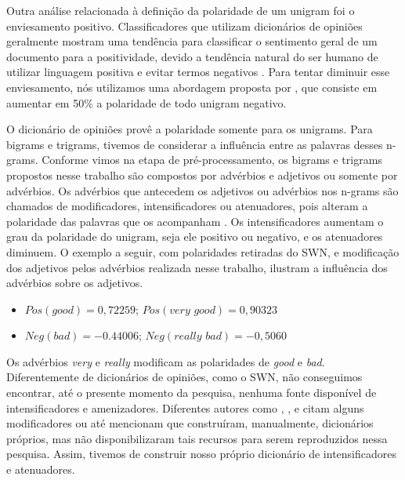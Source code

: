 \documentclass[template.tex]{subfiles}
\begin{document}
Outra análise relacionada à definição da polaridade de um unigram foi o enviesamento positivo. Classificadores que utilizam dicionários de opiniões geralmente mostram uma tendência para classificar o sentimento geral de um documento para a positividade, devido a tendência natural do ser humano de utilizar linguagem positiva e evitar termos negativos \cite{boucher1969pollyanna, kennedy2006sentiment}. Para tentar diminuir esse enviesamento, nós utilizamos uma abordagem proposta por , que consiste em aumentar em 50\% a polaridade de todo unigram negativo. 


O dicionário de opiniões provê a polaridade somente para os unigrams. Para bigrams e trigrams, tivemos de considerar a influência entre as palavras desses n-grams. Conforme vimos na etapa de pré-processamento, os bigrams e trigrams propostos nesse trabalho são compostos por advérbios e adjetivos ou somente por advérbios. Os advérbios que antecedem os adjetivos ou advérbios nos n-grams são chamados de modificadores, intensificadores ou atenuadores, pois alteram a polaridade das palavras que os acompanham \cite{voll2007not}. Os intensificadores aumentam o grau da polaridade do unigram, seja ele positivo ou negativo, e os atenuadores diminuem. O exemplo a seguir, com polaridades retiradas do SWN, e modificação dos adjetivos pelos advérbios realizada nesse trabalho, ilustram a influência dos advérbios sobre os adjetivos.  


\begin{itemize}
\item \label{itm:very_exem} $Pos(\textit{good}) = 0,72259$; $Pos(\textit{very good}) = 0,90323$
\item \label{itm:really_exem} $Neg(\textit{bad}) = -0.44006$; $Neg(\textit{really bad}) = -0,5060$
\end{itemize}

Os advérbios \textit{very} e \textit{really} modificam as polaridades de \textit{good} e \textit{bad}. Diferentemente de dicionários de opiniões, como o SWN, não conseguimos encontrar, até o presente momento da pesquisa, nenhuma fonte disponível de intensificadores e amenizadores. Diferentes autores como , ,  e  citam alguns modificadores ou até mencionam que construíram, manualmente, dicionários próprios, mas não disponibilizaram tais recursos para serem reproduzidos nessa pesquisa. Assim, tivemos de construir nosso próprio dicionário de intensificadores e atenuadores. 
\end{document}
